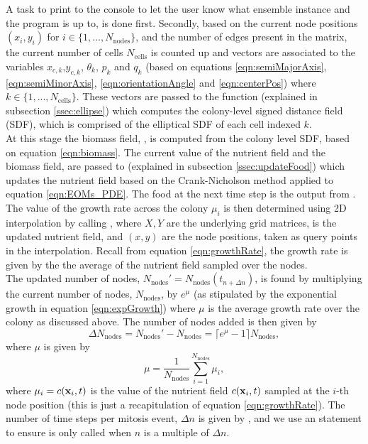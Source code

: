 A task to print to the console to let the user know what ensemble instance
and  the program is up to, is done first.
Secondly, based on the current node positions $(x_i,y_i)$ for
$i \in \{1, ..., N_{\textrm{nodes}}\}$, and the number
of edges present in the  matrix, the current number of cells
$N_{\textrm{cells}}$ is counted up
and vectors are associated to the variables $x_{c,k}$,$y_{c,k}$,
$\theta_k$, $p_k$ and $q_k$ (based on equations
 \ref{eqn:semiMajorAxis}, \ref{eqn:semiMinorAxis},
\ref{eqn:orientationAngle} and \ref{eqn:centerPos}) where $k \in \{1, ..., N_{\textrm{cells}}\}$.
These vectors are passed to the function  (explained in 
subsection \ref{ssec:ellipse})
which computes the colony-level signed distance field (SDF),
which is comprised of the elliptical SDF of each cell indexed $k$.
\\

At this stage the biomass field, , is computed 
from the colony level SDF, based on equation \ref{eqn:biomass}.
The current value of the nutrient field and the biomass field,
are passed to  (explained in 
subsection \ref{ssec:updateFood}) which updates the nutrient field
based on the Crank-Nicholson method applied to equation \ref{eqn:EOMs_PDE}.
The food at the next time step is the output from .
\\

The value of the growth rate across the colony $\mu_i$ is then determined
using 2D interpolation by calling ,
where $X, Y$ are the underlying grid matrices,  is the updated nutrient 
field, and $(x,y)$ are the node positions, taken as query points in the interpolation.
Recall from equation \ref{eqn:growthRate}, the growth rate 
is given by the the average of the nutrient field sampled over the nodes.
\\

The updated number of nodes, $N_{\textrm{nodes}}' = N_{\textrm{nodes}}(t_{n + \Delta n})$, is found 
by multiplying the current number of nodes, $N_{\textrm{nodes}}$,
by $e^{\mu}$ (as stipulated by the exponential growth in equation \ref{eqn:expGrowth}) where $\mu$ is the average growth rate over the colony 
as discussed above. The number of nodes added is then given by 
\begin{equation*}
    \Delta N_{\textrm{nodes}} = N_{\textrm{nodes}}' - N_{\textrm{nodes}} = \lceil e^{\mu} -1 \rceil N_{\textrm{nodes}},
\end{equation*}
where $\mu$ is given by 
\begin{equation*}
    \mu = \frac{1}{N_{\textrm{nodes}}} \sum_{i = 1}^{N_{\textrm{nodes}}} \mu_i,
\end{equation*}
where $\mu_i = c(\vb{x}_i, t)$ is the value of the nutrient field $c(\vb{x}_i, t)$ sampled 
at the $i$-th node position (this is just a recapitulation of equation \ref{eqn:growthRate}).
The number of time steps per mitosis event, $\Delta n$ is given by ,
and we use an  statement to ensure  is only called when $n$ 
is a multiple of $\Delta n$.
\\


